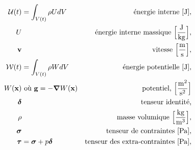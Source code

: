 \begin{align*}
    \mathcal{U}(t) &= \int_{V(t)} \rho U dV & \textrm{énergie interne } [\si{J}],\\
    U & & \textrm{énergie interne massique } \Big[\si{\frac{J}{kg}}\Big],\\
    \vb{v} & & \textrm{vitesse } \Big[\si{\frac{m}{s}}\Big],\\
    \mathcal{W}(t) &= \int_{V(t)} \rho W dV & \textrm{énergie potentielle } [\si{J}],\\
    W(\vb{x}) & \textrm{ où } \vb{g} = -\grad W(\vb{x}) & \textrm{potentiel, }\Big[\si{\frac{m^2}{s^2}}\Big]\\
    \boldsymbol{\delta} & & \textrm{tenseur identité,}\\
    \rho & & \textrm{masse volumique } \Big[\si{\frac{kg}{m^3}}\Big],\\
    \boldsymbol{\sigma} & & \textrm{tenseur de contraintes } [\si{Pa} ],\\
    \boldsymbol{\tau} &= \boldsymbol{\sigma} + p \boldsymbol{\delta} & \textrm{tenseur des extra-contraintes } [\si{Pa}],
  \end{align*}
  \endgroup
